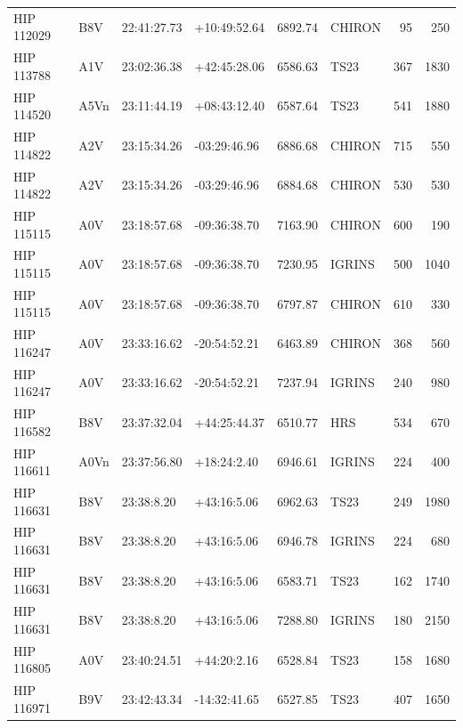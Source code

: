 \documentclass{emulateapj}
\begin{document}
\begin{longtable*}{|l|lllrlrr|}
  HIP 112029 &            B8V &    22:41:27.73 &   +10:49:52.64 &  6892.74 &     CHIRON &       95 &     250 \\
  HIP 113788 &            A1V &    23:02:36.38 &   +42:45:28.06 &  6586.63 &       TS23 &      367 &    1830 \\
  HIP 114520 &           A5Vn &    23:11:44.19 &   +08:43:12.40 &  6587.64 &       TS23 &      541 &    1880 \\
  HIP 114822 &            A2V &    23:15:34.26 &   -03:29:46.96 &  6886.68 &     CHIRON &      715 &     550 \\
  HIP 114822 &            A2V &    23:15:34.26 &   -03:29:46.96 &  6884.68 &     CHIRON &      530 &     530 \\
  HIP 115115 &            A0V &    23:18:57.68 &   -09:36:38.70 &  7163.90 &     CHIRON &      600 &     190 \\
  HIP 115115 &            A0V &    23:18:57.68 &   -09:36:38.70 &  7230.95 &     IGRINS &      500 &    1040 \\
  HIP 115115 &            A0V &    23:18:57.68 &   -09:36:38.70 &  6797.87 &     CHIRON &      610 &     330 \\
  HIP 116247 &            A0V &    23:33:16.62 &   -20:54:52.21 &  6463.89 &     CHIRON &      368 &     560 \\
  HIP 116247 &            A0V &    23:33:16.62 &   -20:54:52.21 &  7237.94 &     IGRINS &      240 &     980 \\
  HIP 116582 &            B8V &    23:37:32.04 &   +44:25:44.37 &  6510.77 &        HRS &      534 &     670 \\
  HIP 116611 &           A0Vn &    23:37:56.80 &    +18:24:2.40 &  6946.61 &     IGRINS &      224 &     400 \\
  HIP 116631 &            B8V &     23:38:8.20 &    +43:16:5.06 &  6962.63 &       TS23 &      249 &    1980 \\
  HIP 116631 &            B8V &     23:38:8.20 &    +43:16:5.06 &  6946.78 &     IGRINS &      224 &     680 \\
  HIP 116631 &            B8V &     23:38:8.20 &    +43:16:5.06 &  6583.71 &       TS23 &      162 &    1740 \\
  HIP 116631 &            B8V &     23:38:8.20 &    +43:16:5.06 &  7288.80 &     IGRINS &      180 &    2150 \\
  HIP 116805 &            A0V &    23:40:24.51 &    +44:20:2.16 &  6528.84 &       TS23 &      158 &    1680 \\
  HIP 116971 &            B9V &    23:42:43.34 &   -14:32:41.65 &  6527.85 &       TS23 &      407 &    1650 \\

\end{longtable*}
\end{document}
